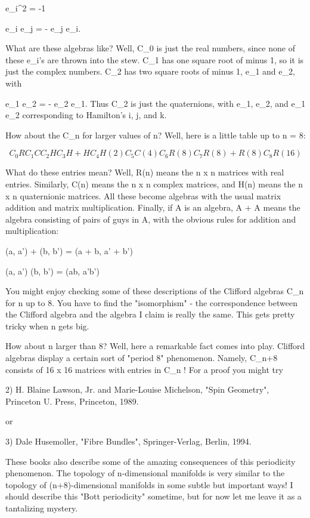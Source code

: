 e_{i}^{2} = -1

e_{i} e_{j} = - e_{j} e_{i}.

What are these algebras like?  Well, C_{0} 
is just the real numbers, since
none of these e_{i}'s are thrown into the stew.  C_{1} 
has one square root of minus 1, so it is just the complex numbers.  
C_{2} has two square roots of minus 1, e_{1} and e_{2},
with 

e_{1} e_{2} = - e_{2} e_{1}.
Thus C_{2} is just the quaternions, with 
e_{1}, e_{2}, and e_{1} e_{2} corresponding
to Hamilton's i, j, and k.  

How about the C_{n} for larger values of n?  
Well, here is a little table up to n = 8:

$$

C_{0}   R
C_{1}   C
C_{2}   H
C_{3}   H + H
C_{4}   H(2) 
C_{5}   C(4)
C_{6}   R(8)
C_{7}   R(8) + R(8)
C_{8}   R(16)
$$
    
What do these entries mean?  Well, R(n) means the n x n matrices with
real entries.  Similarly, C(n) means the n x n complex matrices, and
H(n) means the n x n quaternionic matrices.  All these become algebras
with the usual matrix addition and matrix multiplication.  Finally, if A
is an algebra, A + A means the algebra consisting of pairs of guys in A,
with the obvious rules for addition and multiplication:

(a, a') + (b, b') = (a + b, a' + b')

(a, a') (b, b') = (ab, a'b')

You might enjoy checking some of these descriptions of the Clifford
algebras C_{n} for n up to 8.  You have to find the 
"isomorphism" - the
correspondence between the Clifford algebra and the algebra I claim is
really the same.  This gets pretty tricky when n gets big.  

How about n larger than 8?  Well, here a remarkable fact comes into
play.  Clifford algebras display a certain sort of "period 8"
phenomenon.  Namely, C_{n+8} consists of 16 x 16 matrices with entries
in C_{n} !   For a proof you might try 

2) H. Blaine Lawson, Jr. and Marie-Louise Michelson, "Spin Geometry",
Princeton U. Press, Princeton, 1989.

or

3) Dale Husemoller, "Fibre Bundles", Springer-Verlag, Berlin, 1994.

These books also describe some of the amazing consequences of this
periodicity phenomenon.  The topology of n-dimensional manifolds is very
similar to the topology of (n+8)-dimensional manifolds in some subtle
but important ways!  I should describe this "Bott periodicity" sometime,
but for now let me leave it as a tantalizing mystery.  

